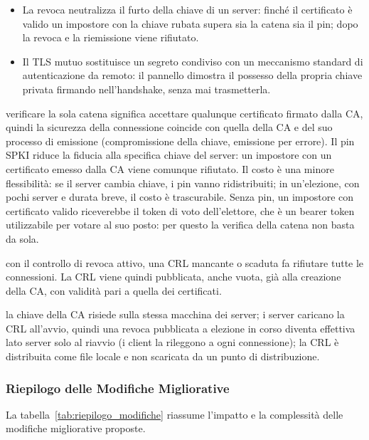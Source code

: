 \documentclass[12pt,a4paper]{article}
\begin{document}
\begin{description}
\begin{itemize}
      \item La revoca neutralizza il furto della chiave di un server: finché il certificato è valido un impostore con la chiave rubata supera sia la catena sia il pin; dopo la revoca e la riemissione viene rifiutato.
      \item Il TLS mutuo sostituisce un segreto condiviso con un meccanismo standard di autenticazione da remoto: il pannello dimostra il possesso della propria chiave privata firmando nell'handshake, senza mai trasmetterla.
    \end{itemize}
  \item[Compromesso tra fiducia nella CA e pinning:] verificare la sola catena significa accettare qualunque certificato firmato dalla CA, quindi la sicurezza della connessione coincide con quella della CA e del suo processo di emissione (compromissione della chiave, emissione per errore). Il pin SPKI riduce la fiducia alla specifica chiave del server: un impostore con un certificato emesso dalla CA viene comunque rifiutato. Il costo è una minore flessibilità: se il server cambia chiave, i pin vanno ridistribuiti; in un'elezione, con pochi server e durata breve, il costo è trascurabile. Senza pin, un impostore con certificato valido riceverebbe il token di voto dell'elettore, che è un bearer token utilizzabile per votare al suo posto: per questo la verifica della catena non basta da sola.
  \item[Compromesso tra revoca e disponibilità:] con il controllo di revoca attivo, una CRL mancante o scaduta fa rifiutare tutte le connessioni. La CRL viene quindi pubblicata, anche vuota, già alla creazione della CA, con validità pari a quella dei certificati.
  \item[Limiti del prototipo:] la chiave della CA risiede sulla stessa macchina dei server; i server caricano la CRL all'avvio, quindi una revoca pubblicata a elezione in corso diventa effettiva lato server solo al riavvio (i client la rileggono a ogni connessione); la CRL è distribuita come file locale e non scaricata da un punto di distribuzione.
\end{description}

\subsubsection{Riepilogo delle Modifiche Migliorative}

La tabella~\ref{tab:riepilogo_modifiche} riassume l'impatto e la complessità delle modifiche migliorative proposte.
\end{document}
